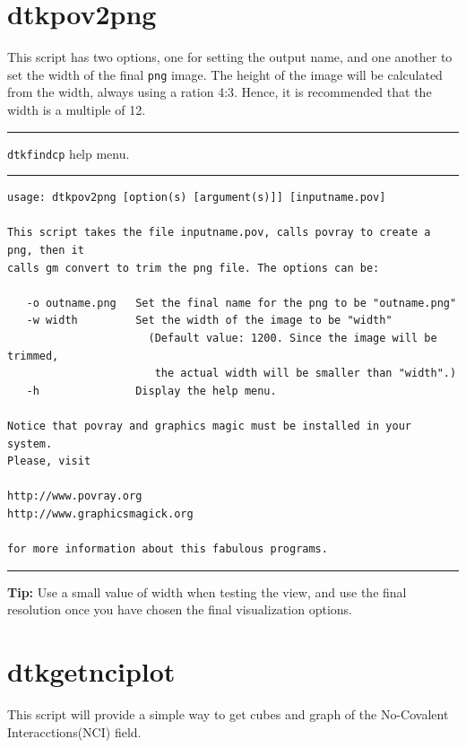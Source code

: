 \section{dtkpov2png}

This script has two options, one for setting the output name, and one another to set the width of the final \texttt{png} image. The height of the image will be calculated from the width, always using a ration 4:3. Hence, it is recommended that the width is a multiple of 12.

\rule{\textwidth}{1pt}
{\center\texttt{dtkfindcp} help menu.\\}
\rule{\textwidth}{1pt}
\begin{footnotesize}
\begin{verbatim}
usage: dtkpov2png [option(s) [argument(s)]] [inputname.pov]

This script takes the file inputname.pov, calls povray to create a png, then it
calls gm convert to trim the png file. The options can be:

   -o outname.png   Set the final name for the png to be "outname.png"
   -w width         Set the width of the image to be "width"
                      (Default value: 1200. Since the image will be trimmed, 
                       the actual width will be smaller than "width".)
   -h               Display the help menu.

Notice that povray and graphics magic must be installed in your system.
Please, visit

http://www.povray.org
http://www.graphicsmagick.org

for more information about this fabulous programs.
\end{verbatim}
\end{footnotesize}
\rule{\textwidth}{1pt}

\textbf{Tip:} Use a small value of width when testing the view, and use the final resolution once you have chosen the final visualization options.

\section{dtkgetnciplot}
This script will provide a simple way to get cubes and graph of the No-Covalent Interacctions(NCI) field.


